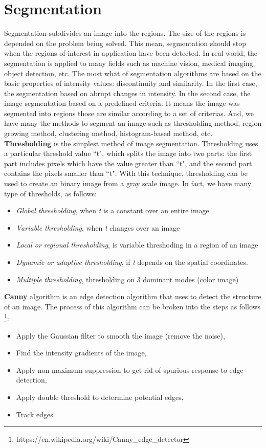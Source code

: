 \section*{Segmentation}
Segmentation subdivides an image into the regions. The size of the regions is depended on the problem being solved. This mean, segmentation should stop when the regions of interest in application have been detected. In real world, the segmentation is applied to many fields such as machine vision, medical imaging, object detection, etc. The most what of segmentation algorithms are based on the basic properties of intensity values: discontinuity and similarity. In the first case, the segmentation based on abrupt changes in intensity. In the second case, the image segmentation based on a predefined criteria. It means the image was segmented into regions those are similar according to a set of criterias. And, we have many the methods to segment an image such as thresholding method, region growing method, clustering method, histogram-based method, etc.\\[0.2 cm]
\textbf{Thresholding} is the simplest method of image segmentation. Thresholding uses a particular threshold value ``t", which splits the image into two parts: the first part includes pixels which have the value greater than ``t", and the second part contains the pixels smaller than ``t". With this technique, thresholding can be used to create an binary image from a gray scale image. In fact, we have many type of thresholds, as follows:
\begin{itemize}
\item \textit{Global thresholding}, when \textit{t} is a constant over an entire image
\item \textit{Variable thresholding}, when \textit{t} changes over an image
\item \textit{Local or regional thresholding}, is variable threshoding in a region of an image
\item \textit{Dynamic or adaptive thresholding}, if \textit{t} depends on the spatial coordinates.
\item \textit{Multiple thresholding}, thresholding on 3 dominant modes (color image)
\end{itemize}
\textbf{Canny} algorithm is an edge detection algorithm that uses to detect the structure of an image. The process of this algorithm can be broken into the steps as follows \footnote{https://en.wikipedia.org/wiki/Canny\_edge\_detector}:
\begin{itemize}
\item Apply the Gaussian filter to smooth the image (remove the noise),
\item Find the intensity gradients of the image,
\item Apply non-maximum suppression to get rid of spurious response to edge detection,
\item Apply double threshold to determine potential edges,
\item Track edges.
\end{itemize}
